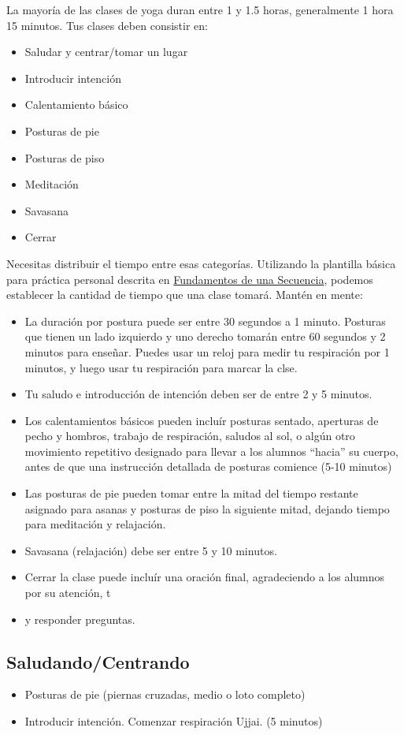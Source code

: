 La mayoría de las clases de yoga duran entre 1 y 1.5 horas, generalmente 1 hora 15 minutos. Tus clases deben consistir en:

\begin{itemize}
	\item Saludar y centrar/tomar un lugar
	\item Introducir intención
	\item Calentamiento básico
	\item Posturas de pie
	\item Posturas de piso
	\item Meditación
	\item Savasana
	\item Cerrar
\end{itemize}

Necesitas distribuir el tiempo entre esas categorías. Utilizando la plantilla básica para práctica personal descrita en \hyperref[sec:fundSec]{Fundamentos de una Secuencia}, podemos establecer la cantidad de tiempo que una clase tomará. Mant\'en en mente:

\begin{itemize}
	\item La duración por postura puede ser entre 30 segundos a 1 minuto. Posturas que tienen un lado izquierdo y uno derecho tomarán entre 60 segundos y 2 minutos para enseñar. Puedes usar un reloj para medir tu respiración por 1 minutos, y luego usar tu respiración para marcar la clse.
	\item Tu saludo e introducción de intención deben ser de entre 2 y 5 minutos.
	\item Los calentamientos básicos pueden incluír posturas sentado, aperturas de pecho y hombros, trabajo de respiración, saludos al sol, o algún otro movimiento repetitivo designado para llevar a los alumnos ``hacia'' su cuerpo, antes de que una instrucción detallada de posturas comience (5-10 minutos)
	\item Las posturas de pie pueden tomar entre la mitad del tiempo restante asignado para asanas y posturas de piso la siguiente mitad, dejando tiempo para meditación y relajación.
	\item Savasana (relajación) debe ser entre 5 y 10 minutos.
	\item Cerrar la clase puede incluír una oración final, agradeciendo a los alumnos por su atención, t\item  y responder preguntas.
\end{itemize}

\subsection{Saludando/Centrando}
\begin{itemize}
	\item Posturas de pie (piernas cruzadas, medio o loto completo)
	\item Introducir intención. Comenzar respiración Ujjai. (5 minutos)
\end{itemize}

